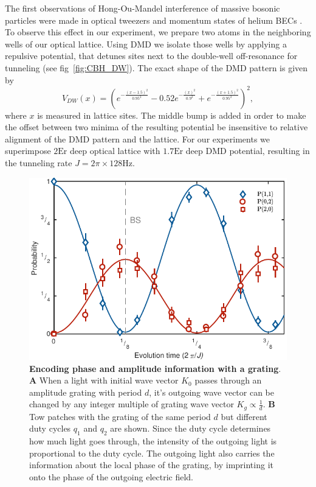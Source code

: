 The first observations of Hong-Ou-Mandel interference of massive bosonic particles were made in optical tweezers \cite{Kaufman2014} and momentum states of helium BECs \cite{Lopes2015}. To observe this effect in our experiment, we prepare two atoms in the neighboring wells of our optical lattice. Using DMD we isolate those wells by applying a repulsive potential, that detunes sites next to the double-well off-resonance for tunneling (see fig~\ref{fig:CBH_DW}). The exact shape of the DMD pattern is given by
\begin{equation}
V_{DW}(x) = (e^{-\frac{(x-1.5)^2}{0.95^2}} - 0.52e^{-\frac{(x)^2}{0.9^2}} + e^{-\frac{(x+1.5)^2}{0.95^2}})^2,
\end{equation}
where $x$ is measured in lattice sites. The middle bump is added in order to make the offset between two minima of the resulting potential be insensitive to relative alignment of the DMD pattern and the lattice. For our experiments we superimpose $2\textrm{Er}$ deep optical lattice with $1.7\textrm{Er}$ deep DMD potential, resulting in the tunneling rate $J = 2 \pi \times 128 \textrm{Hz}$.

\begin{figure}[t]
	\centering
	\includegraphics[scale=1]{figures/CBH_HOM.pdf}
	\caption{{\bf Encoding phase and amplitude information with a grating}. {\bf A} When a light with initial wave vector $K_0$ passes through an amplitude grating with period $d$, it's outgoing wave vector can be changed by any integer multiple of grating wave vector $K_g\propto \frac{1}{d}$. {\bf B} Tow patches with the grating of the same period $d$ but different duty cycles $q_1$ and $q_2$ are shown. Since the duty cycle determines how much light goes through, the intensity of the outgoing light is proportional to the duty cycle. The outgoing light also carries the information about the local phase of the grating, by imprinting it onto the phase of the outgoing electric field.}
	\label{fig:CBH_HOM}
\end{figure}

